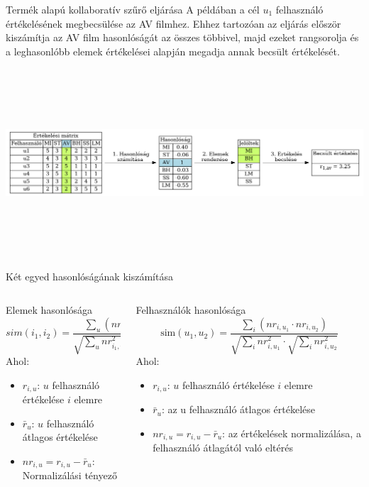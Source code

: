 \documentclass[english, aspectratio=169]{beamer}
\begin{document}
\begin{frame}{Termék alapú kollaboratív szűrő eljárása}
A példában a cél $u_1$ felhasználó értékelésének megbecsülése az AV filmhez. Ehhez tartozóan  az eljárás először kiszámítja az AV film hasonlóságát az összes többivel, majd ezeket rangsorolja és a leghasonlóbb elemek értékelései alapján megadja annak becsült értékelését.\par\medskip
\begin{center}
\includegraphics[width=14cm, height=7cm, keepaspectratio]{graphs/recommender_5.png}
\end{center}
\end{frame}

\begin{frame}{Két egyed hasonlóságának kiszámítása}
\begin{columns}
\begin{column}{.5\textwidth}
\begin{block}{Elemek hasonlósága}
\[
sim\left( i_1,i_2 \right) = \frac{\sum_u\left( nr_{i_1,u} \cdot nr_{i_2,u} \right)}{\sqrt{\sum_u nr^2_{i_1,u}} \cdot \sqrt{\sum_u nr^2_{i_1,u}}}
\]
Ahol:
\begin{itemize}
	\item $r_{i,u}$: $u$ felhasználó értékelése $i$ elemre
	\item $\bar{r}_u$: $u$ felhasználó átlagos értékelése
	\item $nr_{i,u}=r_{i,u} - \bar{r}_u$: Normalizálási tényező
\end{itemize}
\end{block}
\end{column}
\begin{column}{.5\textwidth}
\begin{block}{Felhasználók hasonlósága}
\[
\text{sim}(u_1, u_2) = \frac{\sum_{i} (nr_{i,u_1} \cdot nr_{i,u_2})}
{\sqrt{\sum_{i} nr_{i,u_1}^2} \cdot \sqrt{\sum_{i} nr_{i,u_2}^2}}
\]
Ahol:
\begin{itemize}
    \item \( r_{i,u} \): $u$ felhasználó értékelése $i$ elemre
    \item \( \bar{r}_u \): az u felhasználó átlagos értékelése
    \item \( nr_{i,u} = r_{i,u} - \bar{r}_u \): az értékelések normalizálása, a felhasználó átlagától való eltérés
\end{itemize}
\end{block}
\end{column}
\end{columns}
\end{frame}
\end{document}
